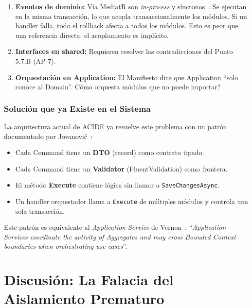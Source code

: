 \documentclass[conference]{IEEEtran}
\begin{document}
\begin{enumerate}[leftmargin=1.5em, itemsep=2pt]
    \item \textbf{Eventos de dominio:} V\'ia MediatR son \textit{in-process} y s\'incronos~\cite{bogard2012}. Se ejecutan en la misma transacci\'on, lo que acopla transaccionalmente los m\'odulos. Si un handler falla, todo el rollback afecta a todos los m\'odulos. Esto es peor que una referencia directa: el acoplamiento es impl\'icito.
    \item \textbf{Interfaces en shared:} Requieren resolver las contradicciones del Punto 5.7.B (AP-7).
    \item \textbf{Orquestaci\'on en Application:} El Manifiesto dice que Application ``solo conoce al Domain''. \textquestiondown C\'omo orquesta m\'odulos que no puede importar?
\end{enumerate}

\subsubsection{Soluci\'on que ya Existe en el Sistema}
La arquitectura actual de ACIDE ya resuelve este problema con un patr\'on documentado por Jovanovi\'c~\cite{jovanovic2024}:

\begin{itemize}[leftmargin=1.5em, itemsep=1pt]
    \item Cada Command tiene un \textbf{DTO} (record) como contrato tipado.
    \item Cada Command tiene un \textbf{Validator} (FluentValidation) como frontera.
    \item El m\'etodo \textbf{Execute} contiene l\'ogica sin llamar a \texttt{SaveChangesAsync}.
    \item Un handler orquestador llama a \texttt{Execute} de m\'ultiples m\'odulos y controla una sola transacci\'on.
\end{itemize}

Este patr\'on es equivalente al \textit{Application Service} de Vernon~\cite{vernon2013}: ``\textit{Application Services coordinate the activity of Aggregates and may cross Bounded Context boundaries when orchestrating use cases}''.


\section{Discusi\'on: La Falacia del Aislamiento Prematuro}
\label{sec:discusion}
\end{document}
